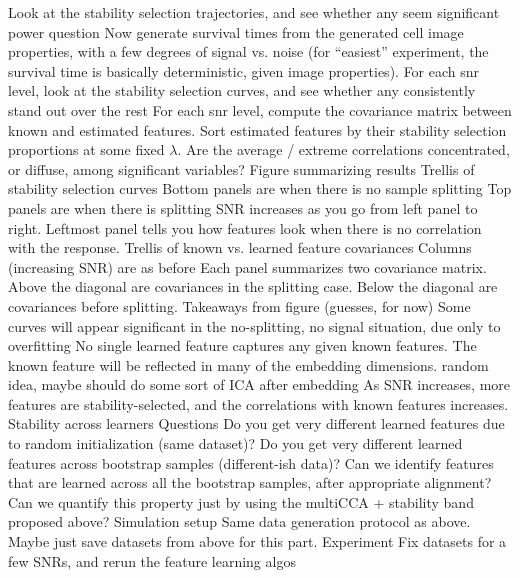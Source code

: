 \documentclass[11pt]{article}
\begin{document}
\begin{outline}
        \4 Look at the stability selection trajectories, and see whether any
        seem significant
      \3 power question
        \4 Now generate survival times from the generated cell image properties,
        with a few degrees of signal vs. noise (for ``easiest'' experiment, the
        survival time is basically deterministic, given image properties).
        \4 For each snr level, look at the stability selection curves, and see
        whether any consistently stand out over the rest
        \4 For each snr level, compute the covariance matrix between known and
        estimated features. Sort estimated features by their stability selection
        proportions at some fixed $\lambda$. Are the average / extreme
        correlations concentrated, or diffuse, among significant variables?
    \2 Figure summarizing results
      \3 Trellis of stability selection curves
        \4 Bottom panels are when there is no sample splitting
        \4 Top panels are when there is splitting
        \4 SNR increases as you go from left panel to right. Leftmost panel
        tells you how features look when there is no correlation with the
        response.
      \3 Trellis of known vs. learned feature covariances
        \4 Columns (increasing SNR) are as before
        \4 Each panel summarizes two covariance matrix. Above the diagonal are
        covariances in the splitting case. Below the diagonal are covariances
        before splitting.
    \2 Takeaways from figure (guesses, for now)
      \3 Some curves will appear significant in the no-splitting, no signal
      situation, due only to overfitting
      \3 No single learned feature captures any given known features. The known
      feature will be reflected in many of the embedding dimensions.
        \4 random idea, maybe should do some sort of ICA after embedding
      \3 As SNR increases, more features are stability-selected, and the
      correlations with known features increases.
  \1 Stability across learners
    \2 Questions
      \3 Do you get very different learned features due to random initialization
      (same dataset)? Do you get very different learned features across
      bootstrap samples (different-ish data)?
      \3 Can we identify features that are learned across all the bootstrap
      samples, after appropriate alignment? Can we quantify this property just
      by using the multiCCA + stability band proposed above?
    \2 Simulation setup
      \3 Same data generation protocol as above. Maybe just save datasets from
      above for this part.
      \3 Experiment
        \4 Fix datasets for a few SNRs, and rerun the feature learning algos

\end{outline}
\end{document}
